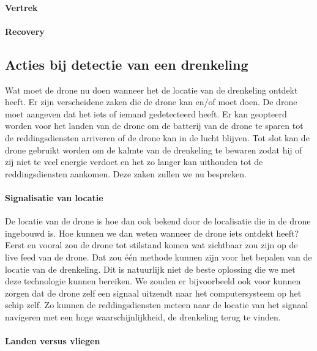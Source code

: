 \paragraph{Vertrek}

\lipsum[1-2]

\paragraph{Recovery}

\lipsum[1-2]

\subsection{Acties bij detectie van een drenkeling}

\subitem
Wat moet de drone nu doen wanneer het de locatie van de drenkeling ontdekt heeft. Er zijn verscheidene zaken die de drone kan en/of moet doen. De drone moet aangeven dat het iets of iemand gedetecteerd heeft. Er kan geopteerd worden voor het landen van de drone om de batterij van de drone te sparen tot de reddingsdiensten arriveren of de drone kan in de lucht blijven. Tot slot kan de drone gebruikt worden om de kalmte van de drenkeling te bewaren zodat hij of zij niet te veel energie verdoet en het zo langer kan uithouden tot de reddingsdiensten aankomen. Deze zaken zullen we nu bespreken.

\paragraph{Signalisatie van locatie}

\subitem
De locatie van de drone is hoe dan ook bekend door de localisatie die in de drone ingebouwd is. Hoe kunnen we dan weten wanneer de drone iets ontdekt heeft? Eerst en vooral zou de drone tot stilstand komen wat zichtbaar zou zijn op de live feed van de drone. Dat zou één methode kunnen zijn voor het bepalen van de locatie van de drenkeling. Dit is natuurlijk niet de beste oplossing die we met deze technologie kunnen bereiken. We zouden er bijvoorbeeld ook voor kunnen zorgen dat de drone zelf een signaal uitzendt naar het computersysteem op het schip zelf. Zo kunnen de reddingsdiensten meteen naar de locatie van het signaal navigeren met een hoge waarschijnlijkheid, de drenkeling terug te vinden.  

\paragraph{Landen versus vliegen}

